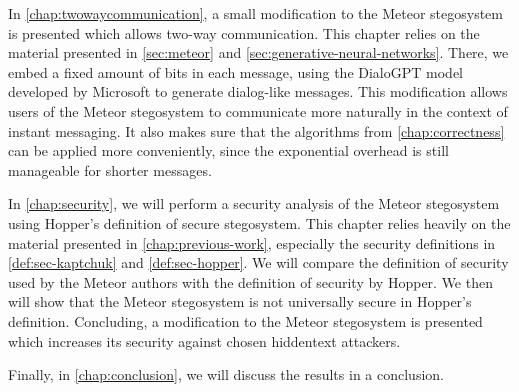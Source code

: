 In \autoref{chap:twowaycommunication}, a small modification to the Meteor stegosystem is presented which allows two-way communication.
This chapter relies on the material presented in \autoref{sec:meteor} and \autoref{sec:generative-neural-networks}.
There, we embed a fixed amount of bits in each message, using the DialoGPT model developed by Microsoft \cite{Zhang2020} to generate dialog-like messages.
This modification allows users of the Meteor stegosystem to communicate more naturally in the context of instant messaging.
It also makes sure that the algorithms from \autoref{chap:correctness} can be applied more conveniently, since the exponential overhead is still manageable for shorter messages.

In \autoref{chap:security}, we will perform a security analysis of the Meteor stegosystem using Hopper's definition of secure stegosystem.
This chapter relies heavily on the material presented in \autoref{chap:previous-work}, especially the security definitions in \autoref{def:sec-kaptchuk} and \autoref{def:sec-hopper}.
We will compare the definition of security used by the Meteor authors with the definition of security by Hopper.
We then will show that the Meteor stegosystem is not universally secure in Hopper's definition.
Concluding, a modification to the Meteor stegosystem is presented which increases its security against chosen hiddentext attackers.

Finally, in \autoref{chap:conclusion}, we will discuss the results in a conclusion.
